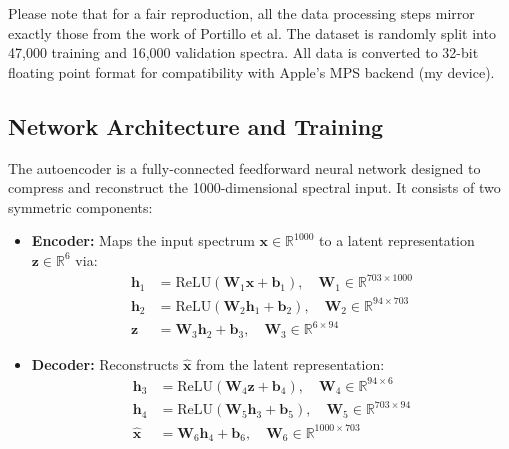 \documentclass[11pt]{article}
\begin{document}
Please note that for a fair reproduction, all the data processing steps mirror exactly those from the work of Portillo et al. The dataset is randomly split into 47,000 training and 16,000 validation spectra. All data is converted to 32-bit floating point format for compatibility with Apple's MPS backend (my device). 

\subsection{Network Architecture and Training}
The autoencoder is a fully-connected feedforward neural network designed to compress and reconstruct the 1000-dimensional spectral input. It consists of two symmetric components:

\begin{itemize}
    \item \textbf{Encoder:} Maps the input spectrum $\mathbf{x} \in \mathbb{R}^{1000}$ to a latent representation $\mathbf{z} \in \mathbb{R}^6$ via:
    \begin{align*}
        \mathbf{h}_1 &= \text{ReLU}(\mathbf{W}_1 \mathbf{x} + \mathbf{b}_1), \quad \mathbf{W}_1 \in \mathbb{R}^{703 \times 1000} \\
        \mathbf{h}_2 &= \text{ReLU}(\mathbf{W}_2 \mathbf{h}_1 + \mathbf{b}_2), \quad \mathbf{W}_2 \in \mathbb{R}^{94 \times 703} \\
        \mathbf{z} &= \mathbf{W}_3 \mathbf{h}_2 + \mathbf{b}_3, \quad \mathbf{W}_3 \in \mathbb{R}^{6 \times 94}
    \end{align*}

    \item \textbf{Decoder:} Reconstructs $\hat{\mathbf{x}}$ from the latent representation:
    \begin{align*}
        \mathbf{h}_3 &= \text{ReLU}(\mathbf{W}_4 \mathbf{z} + \mathbf{b}_4), \quad \mathbf{W}_4 \in \mathbb{R}^{94 \times 6} \\
        \mathbf{h}_4 &= \text{ReLU}(\mathbf{W}_5 \mathbf{h}_3 + \mathbf{b}_5), \quad \mathbf{W}_5 \in \mathbb{R}^{703 \times 94} \\
        \hat{\mathbf{x}} &= \mathbf{W}_6 \mathbf{h}_4 + \mathbf{b}_6, \quad \mathbf{W}_6 \in \mathbb{R}^{1000 \times 703}
    \end{align*}
\end{itemize}
\end{document}
